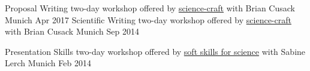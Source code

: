 


\begin{cvhonors}
  \cvhonor
    {Proposal Writing} %
    {two-day workshop offered by \href{http://www.science-craft.com/}{science-craft} with Brian Cusack} %
    {Munich} %
    {Apr 2017} %
  \cvhonor
    {Scientific Writing} %
    {two-day workshop offered by \href{http://www.science-craft.com/}{science-craft} with Brian Cusack} %
    {Munich} %
    {Sep 2014} %
    
  \cvhonor
    {Presentation Skills} %
    {two-day workshop offered by \href{http://www.science.sabinelerch.de/} {soft skills for science} with Sabine Lerch} %
    {Munich} %
    {Feb 2014} %

\end{cvhonors}





